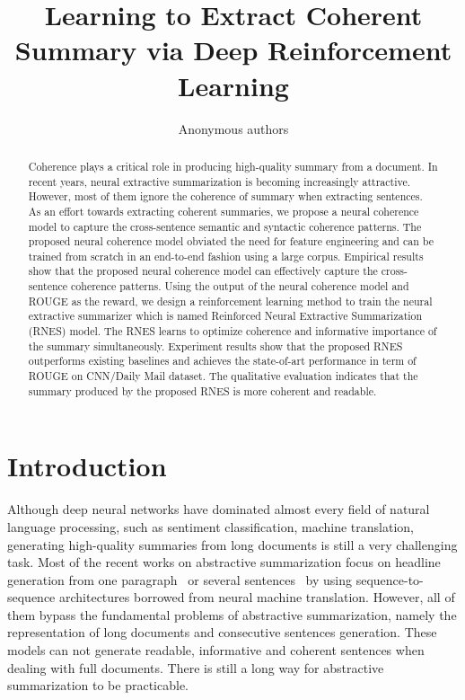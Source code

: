 \documentclass[letterpaper]{article} %
\begin{document}
	\title{Learning to Extract Coherent Summary via Deep Reinforcement Learning}
	\author{Anonymous authors}
	\maketitle
	\begin{abstract}
		 Coherence plays a critical role in producing high-quality summary from a document. In recent years, neural extractive summarization is becoming increasingly attractive. However, most of them ignore the coherence of summary when extracting sentences. As an effort towards extracting coherent summaries, we propose a neural coherence model to capture the cross-sentence semantic and syntactic coherence patterns. The proposed neural coherence model obviated the need for feature engineering and can be trained from scratch in an end-to-end fashion using a large corpus. Empirical results show that the proposed neural coherence model can effectively capture the cross-sentence coherence patterns. Using the output of the neural coherence model and ROUGE as the reward, we design a reinforcement learning method to train the neural extractive summarizer which is named Reinforced Neural Extractive Summarization (RNES) model. The RNES learns to optimize coherence and informative importance of the summary simultaneously. Experiment results show that the proposed RNES outperforms existing baselines and achieves the state-of-art performance in term of ROUGE on CNN/Daily Mail dataset. The qualitative evaluation indicates that the summary produced by the proposed RNES is more coherent and readable.
	\end{abstract}
	
	
	\section{Introduction}
	Although deep neural networks have dominated almost every field of natural language processing, such as sentiment classification\cite{duyutang-sentiment}, machine translation\cite{cho-translation}, generating high-quality summaries from long documents is still a very challenging task. Most of the recent works on abstractive summarization focus on headline generation from one paragraph~\cite{fb2015} or several sentences~\cite{lcsts} by using sequence-to-sequence architectures borrowed from neural machine translation. However, all of them bypass the fundamental problems of abstractive summarization, namely the representation of long documents and consecutive sentences generation. These models can not generate readable, informative and coherent sentences when dealing with full documents.  There is still a long way for abstractive summarization to be practicable.
	
\end{document}
